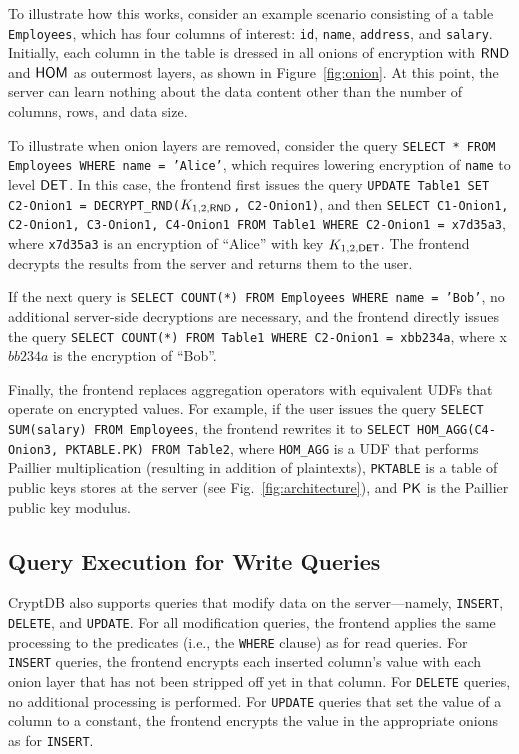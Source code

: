 To illustrate how this works, consider an example scenario consisting of a
table \texttt{Employees}, which has four columns of interest: \texttt{id},
\texttt{name}, \texttt{address}, and {\tt salary}.
Initially, each column in the table is dressed in all onions of encryption
with $\mathsf{RND}$ and $\mathsf{HOM}$ as outermost layers, as shown in Figure~\ref{fig:onion}.
At this point, the server can learn nothing about the data content other
than the number of columns, rows, and data size.

To illustrate when onion layers are removed, consider the query
\texttt{SELECT * FROM Employees WHERE name = 'Alice'},
which requires lowering encryption of {\tt name} to level $\mathsf{DET}$\@.
In this case, the frontend first issues the query
\texttt{UPDATE Table1 SET C2-Onion1 = DECRYPT\_RND($K_{1,2,\mathsf{RND}}$,
C2-Onion1)}, and then 
\texttt{SELECT C1-Onion1, C2-Onion1, C3-Onion1, C4-Onion1 FROM Table1
WHERE C2-Onion1 = x7d35a3}, where  
\texttt{x7d35a3} is an encryption of ``Alice'' with key $K_{1,2,\mathsf{DET}}$\@.
The frontend decrypts the results from the server and returns them to
the user.

If the next query is {\tt SELECT COUNT(*) FROM Employees WHERE
name = 'Bob'}, no additional server-side decryptions are necessary, and
the frontend directly issues the query {\tt SELECT COUNT(*) FROM Table1
WHERE C2-Onion1 = xbb234a}, where x$bb234a$ is the encryption of ``Bob''.

Finally, the frontend replaces aggregation operators with
equivalent UDFs that operate on encrypted values.  For example,
if the user issues the query {\tt SELECT SUM(salary) FROM Employees},
the frontend rewrites it to {\tt SELECT HOM\_AGG(C4-Onion3,
PKTABLE.PK) FROM Table2}, where {\tt HOM\_AGG} is a UDF that performs
Paillier multiplication (resulting in addition of plaintexts),
{\tt PKTABLE} is a table of public keys \name{} stores at the server
(see Fig.~\ref{fig:architecture}), and $\mathsf{PK}$ is the Paillier public
key modulus.


\subsection{Query Execution for Write Queries}

CryptDB also supports queries that modify data on the server---namely,
{\tt INSERT}, {\tt DELETE}, and {\tt UPDATE}.  For all modification queries,
the frontend applies the same processing to the predicates (i.e., the
{\tt WHERE} clause) as for read queries.  For {\tt INSERT} queries, the
frontend encrypts each inserted column's value with each onion layer
that has not been stripped off yet in that column.  For {\tt DELETE}
queries, no additional processing is performed.  For {\tt UPDATE}
queries that set the value of a column to a constant, the frontend
encrypts the value in the appropriate onions as for {\tt INSERT}.

